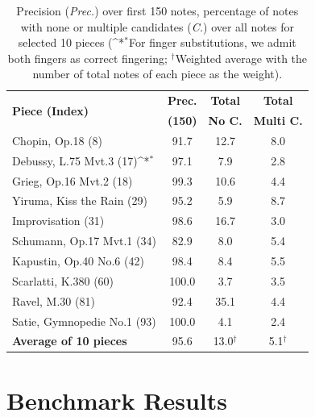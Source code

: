\documentclass{article}
\begin{document}
\begin{table}
\def\sym#1{\ifmmode^{#1}\else\(^{#1}\)\fi}
\centering
\small

\begin{center}
\begin{tabular*}{\columnwidth}{l@{\extracolsep{\fill}}ccc}
\toprule
\multirow{2}{*}{\textbf{Piece (Index)}} &  \textbf{Prec.} & \textbf{Total}  & \textbf{Total} \\                                     &  \textbf{(150)} & \textbf{No C.} & \textbf{Multi C.}\\
\midrule
Chopin, Op.18 (8) &  91.7 & 12.7 & 8.0 \\
Debussy, L.75 Mvt.3 (17)\sym{*} & 97.1 & 7.9 & 2.8 \\
Grieg, Op.16 Mvt.2 (18) & 99.3 & 10.6 & 4.4 \\
Yiruma, Kiss the Rain (29) & 95.2 & 5.9 & 8.7 \\
Improvisation (31) & 98.6 & 16.7 & 3.0 \\
Schumann, Op.17 Mvt.1 (34) & 82.9 & 8.0 & 5.4 \\
Kapustin, Op.40 No.6 (42) & 98.4 & 8.4 & 5.5 \\
Scarlatti, K.380 (60) & 100.0 & 3.7 & 3.5 \\
Ravel, M.30 (81) & 92.4 & 35.1 & 4.4 \\
Satie, Gymnopedie No.1 (93) & 100.0 & 4.1 & 2.4 \\ 
\midrule
\textbf{Average of 10 pieces} & 95.6 & 13.0$^\dagger$ & 5.1$^\dagger$
\\
\bottomrule
\end{tabular*}
\caption{Precision (\textit{Prec.}) over first 150 notes, percentage of notes with none or multiple candidates (\textit{C.}) over all notes for selected 10 pieces (\sym{*}For finger substitutions, we admit both fingers as correct fingering; $^\dagger$Weighted average with the number of total notes of each piece as the weight).}
\vspace{-7mm}  
\label{tab:fingering_results}
\end{center}
\end{table}


\section{Benchmark Results}\label{sec:transcription}
\end{document}
